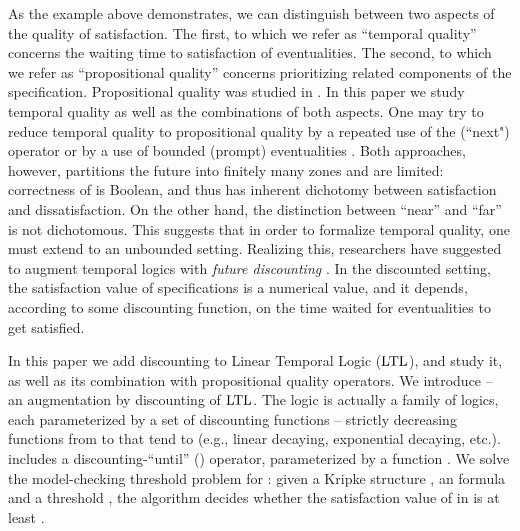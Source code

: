 \documentclass{llncs}
\newcommand{\LTL}{{\ensuremath{\rm LTL}}\xspace}
\newcommand{\stam}[1]{}
\begin{document}
As the example above demonstrates, we can distinguish between two 
aspects 
of the quality of satisfaction. The first, to which we refer as ``temporal quality'' concerns the waiting time to satisfaction of eventualities. The second, to which we refer as ``propositional quality'' concerns prioritizing related components of the specification. 
Propositional quality was studied in \cite{ABK13}. In this paper we study temporal quality as well as the combinations of both aspects. One may try to reduce temporal quality to propositional quality by a repeated use of the  (``next") operator or by a use of  bounded (prompt) eventualities \cite{AHK10,BC06}. Both approaches, however, partitions the future into finitely many zones and are limited: correctness of  is Boolean, and thus has inherent dichotomy between satisfaction and dissatisfaction. On the other hand, the distinction between ``near'' and ``far'' is not dichotomous.
\stam{
One may try to reduce ``temporal quality'' to ``propositional quality'', using the fact that an eventuality involves a repeated choice between satisfying it in the present or delaying its satisfaction to the strict future. This attempt, however, requires unboundedly many applications of the propositional choice, and is similar to a repeated use of the  (``next") operator rather than a use of eventuality operators.
Repeated use of  is a limited solution, 
as it partitions the future into finitely many zones, all of which are in the ``near future'', except for a single, unbounded, ``far future''. A more involved approach to distinguish between the ``near'' and ``far'' future  includes bounded (prompt) eventualities \cite{AHK10,BC06}. There, one distinguishes between eventualities whose waiting time is bounded and ones that have no bound.

The weakness of both approaches is not surprising -- correctness of  is Boolean, and thus has inherent dichotomy between satisfaction and dissatisfaction. The distinction between ``near'' and ``far'', however, is not dichotomous.
} This suggests that in order to formalize temporal quality, one must extend  to an unbounded setting. Realizing this, researchers have suggested to augment temporal logics with {\em future discounting} \cite{AHM03}. In the discounted setting, the satisfaction value of specifications is a numerical value, and it depends, according to some discounting function, on the time waited for eventualities to get satisfied.

In this paper we add discounting to Linear Temporal Logic (\LTL), and study it, as well as its combination with propositional quality operators.
We introduce  -- an augmentation by discounting of \LTL. The logic  is actually a family of logics, each parameterized by a set  of discounting functions --  strictly decreasing functions from  to  that tend to 
(e.g., linear decaying, exponential decaying, etc.).  includes a discounting-``until'' () 
operator, parameterized by a function . We solve the model-checking threshold problem for : given a Kripke structure , an  formula  and a threshold , the algorithm decides whether the satisfaction value of  in  is at least .
\end{document}
